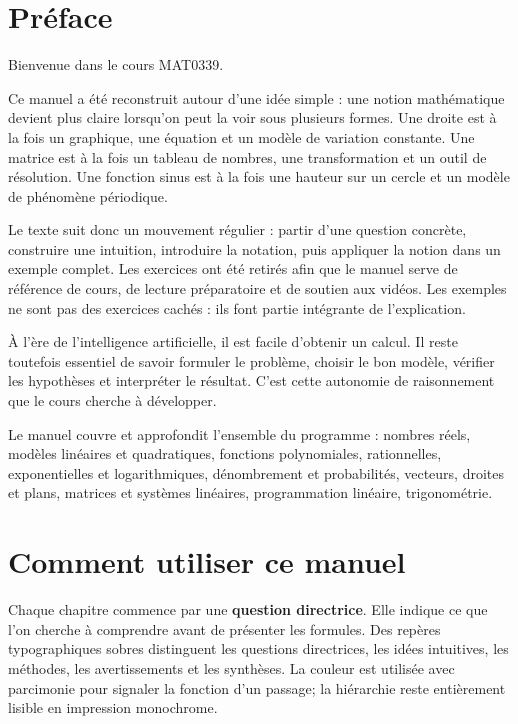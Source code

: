 \documentclass[12pt,a4paper,openany]{book}
\begin{document}
\chapter*{Préface}
Bienvenue dans le cours MAT0339.

Ce manuel a été reconstruit autour d'une idée simple : une notion mathématique devient plus claire lorsqu'on peut la voir sous plusieurs formes. Une droite est à la fois un graphique, une équation et un modèle de variation constante. Une matrice est à la fois un tableau de nombres, une transformation et un outil de résolution. Une fonction sinus est à la fois une hauteur sur un cercle et un modèle de phénomène périodique.

Le texte suit donc un mouvement régulier : partir d'une question concrète, construire une intuition, introduire la notation, puis appliquer la notion dans un exemple complet. Les exercices ont été retirés afin que le manuel serve de référence de cours, de lecture préparatoire et de soutien aux vidéos. Les exemples ne sont pas des exercices cachés : ils font partie intégrante de l'explication.

À l'ère de l'intelligence artificielle, il est facile d'obtenir un calcul. Il reste toutefois essentiel de savoir formuler le problème, choisir le bon modèle, vérifier les hypothèses et interpréter le résultat. C'est cette autonomie de raisonnement que le cours cherche à développer.

\begin{summarybox}
Le manuel couvre et approfondit l'ensemble du programme : nombres réels, modèles linéaires et quadratiques, fonctions polynomiales, rationnelles, exponentielles et logarithmiques, dénombrement et probabilités, vecteurs, droites et plans, matrices et systèmes linéaires, programmation linéaire, trigonométrie.
\end{summarybox}

\chapter*{Comment utiliser ce manuel}
Chaque chapitre commence par une \textbf{question directrice}. Elle indique ce que l'on cherche à comprendre avant de présenter les formules. Des repères typographiques sobres distinguent les questions directrices, les idées intuitives, les méthodes, les avertissements et les synthèses. La couleur est utilisée avec parcimonie pour signaler la fonction d'un passage; la hiérarchie reste entièrement lisible en impression monochrome.
\end{document}
